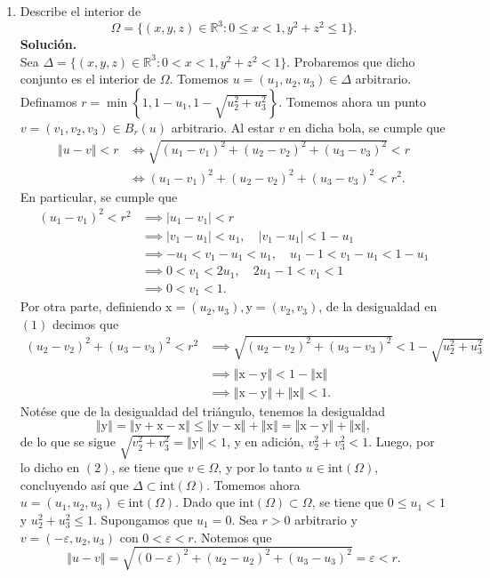 \documentclass[12pt]{article}
\newcommand{\norm}[1]{\left\Vert#1\right\Vert}
\newcommand{\R}{\mathbb R}
\newcommand{\x}{\mathrm x}
\newcommand{\y}{\mathrm y}
\begin{document}
\begin{enumerate}
\newpage
\item Describe el interior de
\[ \Omega = \{ (x,y,z)\in \R^3 : 0\leq x < 1, y^2+z^2\leq 1\}. \]
\textbf{Solución.} \\
Sea $\Delta=\{(x,y,z)\in \R^3 : 0 < x < 1, y^2+z^2<1\}$. Probaremos que dicho conjunto es el interior de $\Omega$. Tomemos $u=(u_1,u_2,u_3)\in \Delta$ arbitrario. Definamos $r=\min\left\{1,1-u_1,1-\sqrt{u_2^2+u_3^2}\right\}$. Tomemos ahora un punto
$v=(v_1,v_2,v_3) \in B_{r}(u)$ arbitrario. Al estar $v$ en dicha bola, se cumple que
\begin{align*}
    \norm{u-v} < r &\iff \sqrt{(u_1-v_1)^2+(u_2-v_2)^2+(u_3-v_3)^2}<r \\
    &\iff (u_1-v_1)^2+(u_2-v_2)^2+(u_3-v_3)^2 < r^2. \tag{1}
\end{align*}
En particular, se cumple que
\begin{align*}
    (u_1-v_1)^2 < r^2 &\implies |u_1-v_1| < r \\
    &\implies |v_1-u_1| < u_1, \quad |v_1-u_1|<1-u_1 \\
    &\implies -u_1 < v_1 - u_1 < u_1, \quad u_1 - 1 < v_1 - u_1 < 1 - u_1 \\
    &\implies 0 < v_1 < 2u_1, \quad 2u_1 - 1 < v_1 < 1 \\
    &\implies 0 < v_1 < 1. \tag{2}
\end{align*}
Por otra parte, definiendo $\x=(u_2,u_3),\y=(v_2,v_3)$, de la desigualdad en $(1)$ decimos que
\begin{align*}
    (u_2-v_2)^2 + (u_3-v_3)^2 < r^2 &\implies \sqrt{(u_2-v_2)^2 + (u_3-v_3)^2} < 1-\sqrt{u_2^2+u_3^2} \\
    &\implies \norm{\x-\y} < 1 - \norm{\x} \\
    &\implies \norm{\x-\y} + \norm{\x} < 1.
\end{align*}
Notése que de la desigualdad del triángulo, tenemos la desigualdad
\[
\norm{\y} = \norm{\y + \x - \x} \leq \norm{\y-\x} + \norm{\x} = \norm{\x-\y} + \norm{\x},
\]
de lo que se sigue $\sqrt{v_2^2+v_3^2} = \norm{\y} < 1$, y en adición, $v_2^2+v_3^2 < 1$. Luego, por lo dicho en $(2)$,
se tiene que $v \in \Omega$, y por lo tanto $u \in \text{int}(\Omega)$, concluyendo así que $\Delta \subset \text{int}(\Omega)$. Tomemos ahora $u=(u_1,u_2,u_3) \in \text{int}(\Omega)$. Dado que $\text{int}(\Omega)\subset \Omega$, se tiene que
$0\leq u_1 < 1$ y $u_2^2+u_3^2 \leq 1$. Supongamos que $u_1 = 0$. Sea $r > 0$ arbitrario y $v=(-\varepsilon,u_2,u_3)$ con $0<\varepsilon<r$. Notemos que
\[
\norm{u-v}=\sqrt{(0-\varepsilon)^2+(u_2-u_2)^2+(u_3-u_3)^2} = \varepsilon < r.
\]
\end{enumerate}
\end{document}
